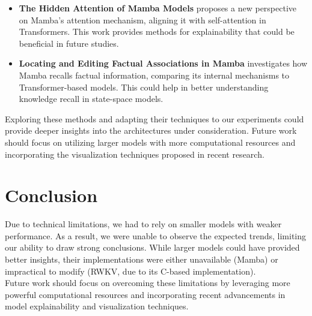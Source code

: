 \documentclass[11pt]{article}
\begin{document}
\begin{itemize}
    \item \textbf{The Hidden Attention of Mamba Models} \cite{ali2024hiddenattentionmambamodels} proposes a new perspective on Mamba’s attention mechanism, aligning it with self-attention in Transformers. This work provides methods for explainability that could be beneficial in future studies.
    \item \textbf{Locating and Editing Factual Associations in Mamba} \cite{sharma2024locatingeditingfactualassociations} investigates how Mamba recalls factual information, comparing its internal mechanisms to Transformer-based models. This could help in better understanding knowledge recall in state-space models.
\end{itemize}

Exploring these methods and adapting their techniques to our experiments could provide deeper insights into the architectures under consideration. Future work should focus on utilizing larger models with more computational resources and incorporating the visualization techniques proposed in recent research.

\section{Conclusion}

Due to technical limitations, we had to rely on smaller models with weaker performance. As a result, we were unable to observe the expected trends, limiting our ability to draw strong conclusions. While larger models could have provided better insights, their implementations were either unavailable (Mamba) or impractical to modify (RWKV, due to its C-based implementation). \\

Future work should focus on overcoming these limitations by leveraging more powerful computational resources and incorporating recent advancements in model explainability and visualization techniques. \\




\appendix


\end{document}
